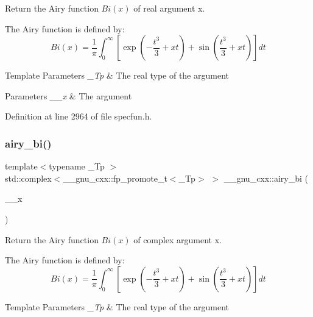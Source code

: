Return the Airy function $ Bi(x) $ of real argument {\ttfamily x}.

The Airy function is defined by\+: \[ Bi(x) = \frac{1}{\pi}\int_0^\infty \left[ \exp \left(-\frac{t^3}{3} + xt \right) + \sin \left(\frac{t^3}{3} + xt \right) \right] dt \]


\begin{DoxyTemplParams}{Template Parameters}
{\em \+\_\+\+Tp} & The real type of the argument \\
\hline
\end{DoxyTemplParams}

\begin{DoxyParams}{Parameters}
{\em \+\_\+\+\_\+x} & The argument \\
\hline
\end{DoxyParams}


Definition at line 2964 of file specfun.\+h.

\mbox{\label{group__mathsf__gnu_ga27cfc90cf84fae2acb2d55a9409ea49c}} 
\subsubsection{\texorpdfstring{airy\+\_\+bi()}{airy\_bi()}\hspace{0.1cm}{\footnotesize\ttfamily [2/2]}}
{\footnotesize\ttfamily template$<$typename \+\_\+\+Tp $>$ \\
std\+::complex$<$\+\_\+\+\_\+gnu\+\_\+cxx\+::fp\+\_\+promote\+\_\+t$<$\+\_\+\+Tp$>$ $>$ \+\_\+\+\_\+gnu\+\_\+cxx\+::airy\+\_\+bi (\begin{DoxyParamCaption}\item[{std\+::complex$<$ \+\_\+\+Tp $>$}]{\+\_\+\+\_\+x }\end{DoxyParamCaption})\hspace{0.3cm}{\ttfamily [inline]}}

Return the Airy function $ Bi(x) $ of complex argument {\ttfamily x}.

The Airy function is defined by\+: \[ Bi(x) = \frac{1}{\pi}\int_0^\infty \left[ \exp \left(-\frac{t^3}{3} + xt \right) + \sin \left(\frac{t^3}{3} + xt \right) \right] dt \]


\begin{DoxyTemplParams}{Template Parameters}
{\em \+\_\+\+Tp} & The real type of the argument \\
\hline
\end{DoxyTemplParams}

